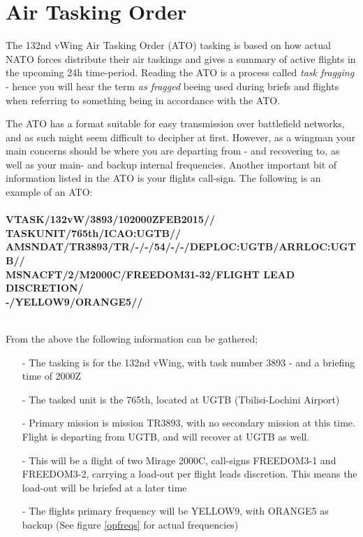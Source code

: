 \section{Air Tasking Order}
	\textnormal{
    	The 132nd vWing Air Tasking Order (ATO) tasking is based on how actual NATO forces distribute their air taskings and gives a summary of active flights in the upcoming 24h time-period. Reading the ATO is a process called \textit{task fragging}  - hence you will hear the term \textit{as fragged} beeing used during briefs and flights when referring to something being in accordance with the ATO. \\
     }
     
     \textnormal{        
        The ATO has a format suitable for easy transmission over battlefield networks, and as such might seem difficult to decipher at first. However, as a wingman your main concerns should be where you are departing from - and recovering to, as well as your main- and backup internal frequencies. Another important bit of information listed in the ATO is your flights call-sign. The following is an example of an ATO: \\ \\
      \textbf{
      	\footnotesize
          \indent VTASK/132vW/3893/102000ZFEB2015// \\
          \indent TASKUNIT/765th/ICAO:UGTB// \\
          \indent AMSNDAT/TR3893/TR/-/-/54/-/-/DEPLOC:UGTB/ARRLOC:UGTB// \\
          \indent MSNACFT/2/M2000C/FREEDOM31-32/FLIGHT LEAD DISCRETION/ \\
          \indent -/YELLOW9/ORANGE5// \\ \\
      }
    }
    
    \textnormal{
    	From the above the following information can be gathered;
    }
    
    \begin{itemize}
      \item[-] The tasking is for the 132nd vWing, with task number 3893 - and a briefing time of 2000Z
      \item[-] The tasked unit is the 765th, located at UGTB (Tbilisi-Lochini Airport)
      \item[-] Primary mission is mission TR3893, with no secondary mission at this time. Flight is departing from UGTB, and will recover at UGTB as well.
      \item[-] This will be a flight of two Mirage 2000C, call-signs FREEDOM3-1 and FREEDOM3-2, carrying a load-out per flight leads discretion. This means the load-out will be briefed at a later time
      \item[-] The flights primary frequency will be YELLOW9, with ORANGE5 as backup (See figure \ref{opfreqs} for actual frequencies) \\
    \end{itemize}
    

